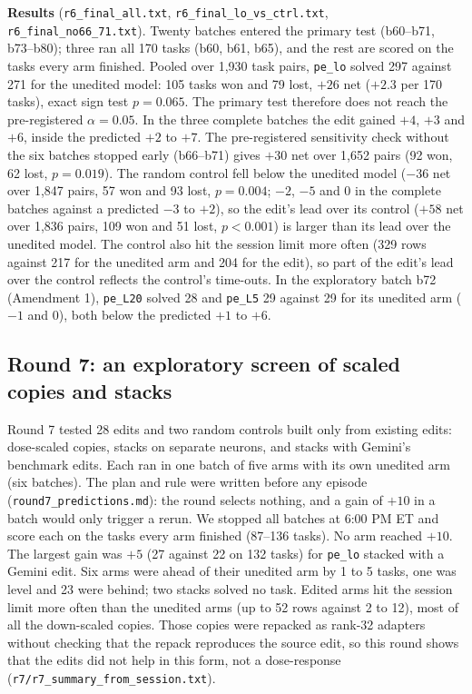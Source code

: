\textbf{Results} (\texttt{r6\_final\_all.txt}, \texttt{r6\_final\_lo\_vs\_ctrl.txt}, \texttt{r6\_final\_no66\_71.txt}). Twenty batches entered the primary test (b60--b71, b73--b80); three ran all 170 tasks (b60, b61, b65), and the rest are scored on the tasks every arm finished. Pooled over 1,930 task pairs, \texttt{pe\_lo} solved 297 against 271 for the unedited model: 105 tasks won and 79 lost, $+26$ net ($+2.3$ per 170 tasks), exact sign test $p = 0.065$. The primary test therefore does not reach the pre-registered $\alpha = 0.05$. In the three complete batches the edit gained $+4$, $+3$ and $+6$, inside the predicted $+2$ to $+7$. The pre-registered sensitivity check without the six batches stopped early (b66--b71) gives $+30$ net over 1,652 pairs (92 won, 62 lost, $p = 0.019$). The random control fell below the unedited model ($-36$ net over 1,847 pairs, 57 won and 93 lost, $p = 0.004$; $-2$, $-5$ and $0$ in the complete batches against a predicted $-3$ to $+2$), so the edit's lead over its control ($+58$ net over 1,836 pairs, 109 won and 51 lost, $p < 0.001$) is larger than its lead over the unedited model. The control also hit the session limit more often (329 rows against 217 for the unedited arm and 204 for the edit), so part of the edit's lead over the control reflects the control's time-outs. In the exploratory batch b72 (Amendment 1), \texttt{pe\_L20} solved 28 and \texttt{pe\_L5} 29 against 29 for its unedited arm ($-1$ and $0$), both below the predicted $+1$ to $+6$.

\subsection{Round 7: an exploratory screen of scaled copies and stacks}
\label{app:round7}
Round 7 tested 28 edits and two random controls built only from existing edits: dose-scaled copies, stacks on separate neurons, and stacks with Gemini's benchmark edits. Each ran in one batch of five arms with its own unedited arm (six batches). The plan and rule were written before any episode (\texttt{round7\_predictions.md}): the round selects nothing, and a gain of $+10$ in a batch would only trigger a rerun. We stopped all batches at 6:00 PM ET and score each on the tasks every arm finished (87--136 tasks). No arm reached $+10$. The largest gain was $+5$ (27 against 22 on 132 tasks) for \texttt{pe\_lo} stacked with a Gemini edit. Six arms were ahead of their unedited arm by 1 to 5 tasks, one was level and 23 were behind; two stacks solved no task. Edited arms hit the session limit more often than the unedited arms (up to 52 rows against 2 to 12), most of all the down-scaled copies. Those copies were repacked as rank-32 adapters without checking that the repack reproduces the source edit, so this round shows that the edits did not help in this form, not a dose-response (\texttt{r7/r7\_summary\_from\_session.txt}).
